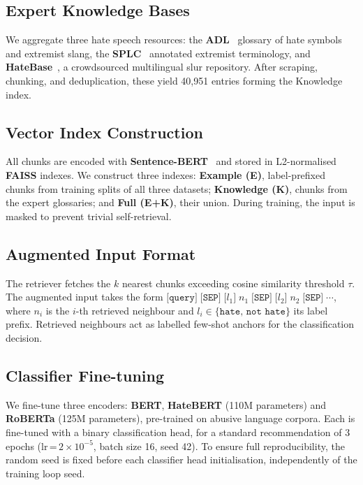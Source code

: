 \documentclass{article}
\begin{document}
\subsection{Expert Knowledge Bases}
We aggregate three hate speech resources: the \textbf{ADL}~\cite{adl} glossary of hate symbols and extremist slang, the \textbf{SPLC}~\cite{splc} annotated extremist terminology, and \textbf{HateBase}~\cite{hatebase}, a crowdsourced multilingual slur repository. After scraping, chunking, and deduplication, these yield 40,951 entries forming the Knowledge index.

\subsection{Vector Index Construction}
All chunks are encoded with \textbf{Sentence-BERT}~\cite{reimers2019sbert} and stored in L2-normalised \textbf{FAISS} indexes. We construct three indexes: \textbf{Example (E)}, label-prefixed chunks from training splits of all three datasets; \textbf{Knowledge (K)}, chunks from the expert glossaries; and \textbf{Full (E+K)}, their union. During training, the input is masked to prevent trivial self-retrieval.

\subsection{Augmented Input Format}
The retriever fetches the $k$ nearest chunks exceeding cosine similarity threshold $\tau$. The augmented input takes the form $\texttt{[query]} \;\texttt{[SEP]}\; \texttt{[}l_1\texttt{]}\; n_1 \;\texttt{[SEP]}\; \texttt{[}l_2\texttt{]}\; n_2 \;\texttt{[SEP]}\; \cdots$, where $n_i$ is the $i$-th retrieved neighbour and $l_i \in \{\texttt{hate},\, \texttt{not hate}\}$ its label prefix. Retrieved neighbours act as labelled few-shot anchors for the classification decision.

\subsection{Classifier Fine-tuning}
We fine-tune three encoders: \textbf{BERT},  \textbf{HateBERT} (110M parameters) and \textbf{RoBERTa} (125M parameters), pre-trained on abusive language corpora. Each is fine-tuned with a binary classification head, for a standard recommendation of 3 epochs (lr\,=\,$2{\times}10^{-5}$, batch size 16, seed 42). To ensure full reproducibility, the random seed is fixed before each classifier head initialisation, independently of the training loop seed.
\end{document}
